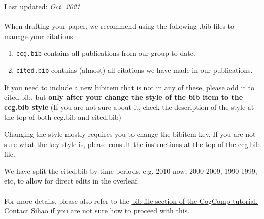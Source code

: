 \documentclass[11pt,a4paper]{article}
\begin{document}
Last updated: \textit{Oct. 2021}\\\\
When drafting your paper, we recommend using the following .bib files to manage your citations. \cite{DCLT19} 
\begin{enumerate}
    \item \texttt{ccg.bib} contains all publications from our group to date.
    \item \texttt{cited.bib} contains (almost) all citations we have made in our publications. 
\end{enumerate}

If you need to include a new bibitem that is not in any of these, please add it to cited.bib, but {\bf only after your change the style of the bib item to the ccg.bib style}
(If you are not sure about it, check the description of the style at the top of both ccg.bib and cited.bib)

Changing the style mostly requires you to change the bibitem key. If you are not sure what the key style is, please consult the instructions at the top of the ccg.bib file.

We have split the cited.bib by time periods. e.g. 2010-now, 2000-2009, 1990-1999, etc, to allow for direct edits in the overleaf. \\\\
For more details, please also refer to the \href{ https://docs.google.com/document/d/1I33aIJXMzIIaZQDHZzdpDEink5fKztU_VKFlbj-KzhA/edit#heading=h.k9gb5efodg4w}{\color{blue} bib file section of the CogComp tutorial. } \\

Contact Sihao if you are not sure how to proceed with this. 



\end{document}
